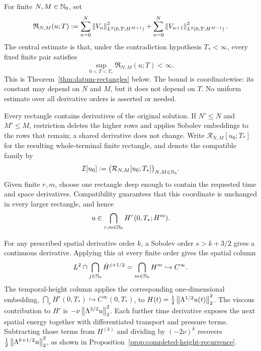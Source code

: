 For finite \(N,M\in\mathbb N_0\), set
\begin{equation}
 \mathfrak R_{N,M}(u;T)
 :=\sum_{n=0}^{N}\left\lVert V_n\right\rVert_{L^2(0,T;H^{M+1})}^2
 +\sum_{n=0}^{N}\left\lVert V_{n+1}\right\rVert_{L^2(0,T;H^{M-1})}^2.
 \label{eq:intro-rectangle-norm}
\end{equation}
The central estimate is that, under the contradiction hypothesis
\(T_*<\infty\), every fixed finite pair satisfies
\begin{equation}
 \sup_{0<T<T_*}\mathfrak R_{N,M}(u;T)<\infty.
 \label{eq:intro-terminal-rectangle}
\end{equation}
This is Theorem~\ref{thm:datum-rectangles} below.
The bound is coordinatewise: its constant may depend on \(N\) and \(M\), but
it does not depend on \(T\).  No uniform estimate over all derivative orders
is asserted or needed.

Every rectangle contains derivatives of the original solution.  If
\(N'\le N\) and \(M'\le M\), restriction deletes the higher rows and applies
Sobolev embeddings to the rows that remain; a shared derivative does not
change.  Write \(\mathcal R_{N,M}[u_0;T_*]\) for the resulting whole-terminal
finite rectangle, and denote the compatible family by
\begin{equation}
 \mathcal I[u_0]
 :=\bigl(\mathcal R_{N,M}[u_0;T_*]\bigr)_{N,M\in\mathbb N_0}.
 \label{eq:intro-compatible-intersection}
\end{equation}
Given finite \(r,m\), choose one rectangle deep enough to contain the
requested time and space derivatives.  Compatibility guarantees that this
coordinate is unchanged in every larger rectangle, and hence
\begin{equation}
 u\in\bigcap_{r,m\in\mathbb N_0}H^r(0,T_*;H^m).
 \label{eq:intro-all-orders-intersection}
\end{equation}

For any prescribed spatial derivative order \(k\), a Sobolev order
\(s>k+3/2\) gives a continuous derivative.  Applying this at every finite
order gives the spatial column
\[
 L^2\cap\bigcap_{j\in\mathbb N_0}\dot H^{j+1/2}
 =\bigcap_{m\in\mathbb N_0}H^m\hookrightarrow C^\infty.
\]
The temporal-height column applies the corresponding one-dimensional
embedding, \(\bigcap_r H^r(0,T_*)\hookrightarrow C^\infty(0,T_*)\), to
\(H(t)=\tfrac12\left\lVert \Lambda^{1/2}u(t)\right\rVert_2^2\).
The viscous contribution to \(H'\) is
\(-\nu\left\lVert \Lambda^{3/2}u\right\rVert_2^2\).  Each further time derivative exposes
the next spatial energy together with differentiated transport and pressure
terms.  Subtracting those terms from \(H^{(k)}\) and dividing by
\((-2\nu)^k\) recovers \(\tfrac12\left\lVert \Lambda^{k+1/2}u\right\rVert_2^2\), as shown
in Proposition~\ref{prop:completed-height-recurrence}.

